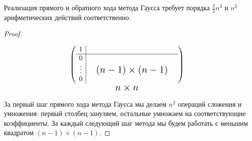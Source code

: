 \begin{lemma}
  Реализация прямого и обратного хода метода Гаусса требует
  порядка $\frac{2}{3}n^3$ и $n^2$ арифметических действий соответственно.
\end{lemma}
\begin{proof}$ $\newline
  \begin{minipage}{.4\linewidth}
    \[\underset{\mbox{\Large $n\times n$}}{{\left(\begin{array}{c|ccc}
                1      &  &                                 & \\
                \hline
                0      &  &                                 & \\
                \vdots &  & \mbox{\Large$(n-1)\times(n-1)$} & \\
                0      &  &                                 & \\
              \end{array}\right)}}\]
  \end{minipage}\hfill
  \begin{minipage}{.5\linewidth}
    За первый шаг прямого хода метода Гаусса мы делаем $n^2$ операций сложения и умножения:
    первый столбец зануляем, остальные умножаем на соответствующие коэффициенты.
    За каждый следующий шаг метода мы будем работать с меньшим квадратом $(n-1)\times(n-1)$.
  \end{minipage}


\end{proof}
